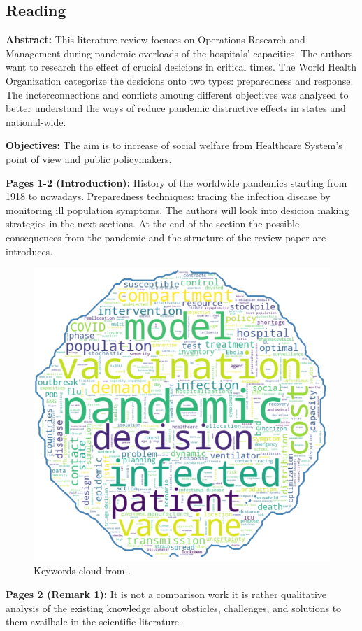 \subsection{Reading}
    \textbf{Abstract:}
    This literature review focuses on Operations Research and Management during pandemic overloads of the hospitals' capacities. The authors want to research the effect of crucial desicions in critical times. The World Health Organization categorize the desicions onto two types: preparedness and response. The incterconnections and conflicts amoung different objectives was analysed to better understand the ways of reduce pandemic distructive effects in states and national-wide. 
    
    \textbf{Objectives:}
    The aim is to increase of social welfare from Healthcare System's point of view and public policymakers. 

    
    \textbf{Pages 1-2 (Introduction):}
    History of the worldwide pandemics starting from 1918 to nowadays. Preparedness techniques: tracing the infection disease by monitoring ill population symptoms. The authors will look into desicion making strategies in the next sections. At the end of the section the possible consequences from the pandemic and the structure of the review paper are introduces. 
    \begin{figure}[H]
        \centering
        \includegraphics[width=.6\textwidth]{figures/0018_SR01CA23/fig1.png}
        \caption{Keywords cloud from \cite{x128}.}
        \label{fig1:0018_SR01CA23}
    \end{figure}
    
    \textbf{Pages 2 (Remark 1):}
    It is not a comparison work it is rather qualitative analysis of the existing knowledge about obsticles, challenges, and solutions to them availbale in the scientific literature.
    
